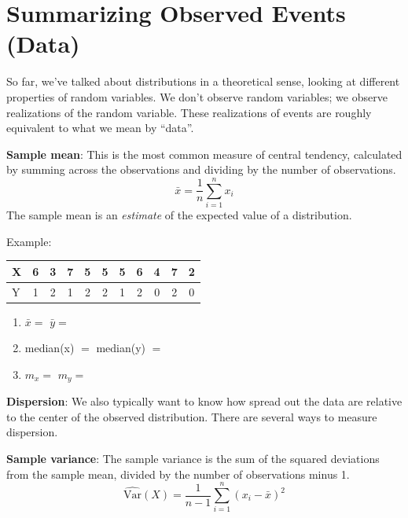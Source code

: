 \documentclass[
]{book}
\begin{document}
\hypertarget{summarizing-observed-events-data}{%
\section{Summarizing Observed Events (Data)}\label{summarizing-observed-events-data}}

So far, we've talked about distributions in a theoretical sense, looking at different properties of random variables. We don't observe random variables; we observe realizations of the random variable. These realizations of events are roughly equivalent to what we mean by ``data''.

\textbf{Sample mean}: This is the most common measure of central tendency, calculated by summing across the observations and dividing by the number of observations.
\[\bar{x} = \frac{1}{n}\sum_{i=1}^{n}x_i\]
The sample mean is an \emph{estimate} of the expected value of a distribution.

\begin{framed}
Example:  
\begin{center}
\begin{tabular}{|l|cccccccccc|}
\hline
X & 6 & 3 & 7 & 5 & 5 & 5 & 6 & 4 & 7 & 2\\
\hline
Y & 1 & 2 & 1 & 2 & 2 & 1 & 2 & 0 & 2 & 0\\
\hline
\end{tabular}
\end{center}

\begin{enumerate}
\item $\bar{x} = $ \hspace{3.1cm} $\bar{y} = $
\item median(x) $ = $ \hspace{1.5cm} median(y) $ = $
\item $m_x = $ \hspace{2.75cm} $m_y =$\\
\end{enumerate}
\end{framed}

\textbf{Dispersion}: We also typically want to know how spread out the data are relative to the center of the observed distribution. There are several ways to measure dispersion.

\textbf{Sample variance}: The sample variance is the sum of the squared deviations from the sample mean, divided by the number of observations minus 1.
\[ \hat{\text{Var}}(X) = \frac{1}{n-1}\sum_{i = 1}^n (x_i - \bar{x})^2\]
\end{document}
